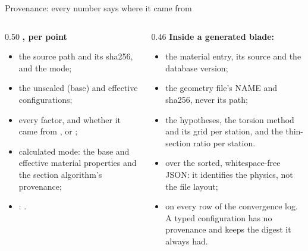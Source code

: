 \begin{frame}{Provenance: every number says where it came from}
\begin{columns}[T]
\begin{column}{0.50\textwidth}
\textbf{\small {}, per point}
\begin{itemize}\scriptsize
  \item the source path and its sha256, and the mode;
  \item the unscaled (base) and effective configurations;
  \item every factor, and whether it came from ,  or
        ;
  \item calculated mode: the base and effective material properties and the
        section algorithm's provenance;
  \item {}: .
\end{itemize}
\end{column}
\begin{column}{0.46\textwidth}
\textbf{\small Inside a generated blade: }
\begin{itemize}\scriptsize
  \item the material entry, its source and the database version;
  \item the geometry file's NAME and sha256, never its path;
  \item the hypotheses, the torsion method and its grid per station, and the
        thin-section ratio per station.
\end{itemize}
\textbf{\small {}}
\begin{itemize}\scriptsize
  \item over the sorted, whitespace-free JSON: it identifies the physics, not
        the file layout;
  \item on every row of the convergence log. A typed configuration has no
        provenance and keeps the digest it always had.
\end{itemize}
\end{column}
\end{columns}
\end{frame}
